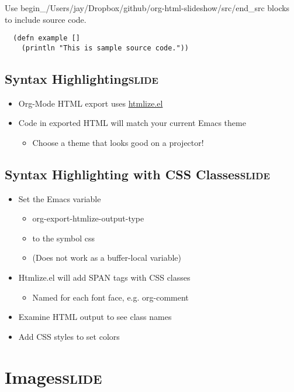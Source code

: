 \documentclass[11pt]{article}
\begin{document}
Use begin_/Users/jay/Dropbox/github/org-html-slideshow/src/end_src blocks to include source code.

\begin{verbatim}
  (defn example []
    (println "This is sample source code."))
\end{verbatim}

\subsection{Syntax Highlighting\hfill{}\textsc{slide}}
\label{sec:orgheadline63}

\begin{itemize}
\item Org-Mode HTML export uses \href{http://www.emacswiki.org/emacs/Htmlize}{htmlize.el}
\item Code in exported HTML will match your current Emacs theme
\begin{itemize}
\item Choose a theme that looks good on a projector!
\end{itemize}
\end{itemize}

\subsection{Syntax Highlighting with CSS Classes\hfill{}\textsc{slide}}
\label{sec:orgheadline64}

\begin{itemize}
\item Set the Emacs variable 
\begin{itemize}
\item org-export-htmlize-output-type
\item to the symbol css
\item (Does not work as a buffer-local variable)
\end{itemize}
\item Htmlize.el will add SPAN tags with CSS classes
\begin{itemize}
\item Named for each font face, e.g. org-comment
\end{itemize}
\item Examine HTML output to see class names
\item Add CSS styles to set colors
\end{itemize}

\section{Images\hfill{}\textsc{slide}}
\label{sec:orgheadline67}
\end{document}
